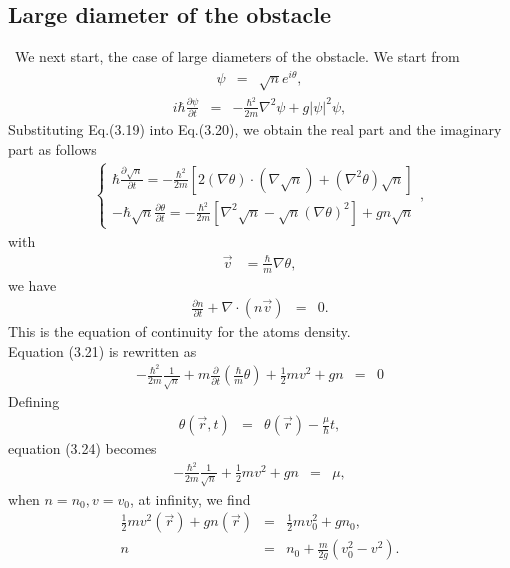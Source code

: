 \documentclass[12pt,a4paper]{report}
\begin{document}
\subsection{Large diameter of the obstacle}
\ We next start, the case of large diameters of the obstacle.
We start from
\begin{eqnarray}
\psi & = & \sqrt{n} e^{i \theta},
\end{eqnarray}
\begin{eqnarray}
i \hbar \frac{\partial \psi}{\partial t} & = &
- \frac{\hbar^2}{2m} \nabla^2 \psi + g | \psi |^2 \psi,
\end{eqnarray}
Substituting Eq.(3.19) into Eq.(3.20), we obtain the real part and the imaginary part as follows
\begin{eqnarray}
\left \{
\begin{array}{l}
\hbar \frac{\partial \sqrt{n}}{\partial t}
= - \frac{\hbar^2}{2m} \left[
2 ( \nabla \theta ) \cdot (\nabla \sqrt{n}) + (\nabla^2 \theta)\sqrt{n}
\right]
\\
-\hbar \sqrt{n} \frac{\partial \theta}{\partial t}
= - \frac{\hbar^2}{2m} \left[
\nabla^2 \sqrt{n} - \sqrt{n} (\nabla \theta)^2
\right]
+ gn \sqrt{n}
\end{array}
\right . ,
\end{eqnarray}
with
\begin{eqnarray}
\vec{v} & = \frac{\hbar}{m} \nabla \theta,
\end{eqnarray}
we have
\begin{eqnarray}
\frac{\partial n}{\partial t} + \nabla \cdot (n \vec{v}) & = & 0.
\end{eqnarray}
This is the equation of continuity for the atoms density.
\\
Equation (3.21) is rewritten as
\begin{eqnarray}
-\frac{\hbar^2}{2m} \frac{1}{\sqrt{n}} + m \frac{\partial}{\partial t} \left( \frac{\hbar}{m} \theta \right)
+ \frac{1}{2} m v^2 + gn & = & 0
\end{eqnarray}
Defining
\begin{eqnarray}
\theta ( \vec{r}, t) & = & \theta( \vec{r} ) - \frac{\mu}{\hbar} t,
\end{eqnarray}
equation (3.24) becomes
\begin{eqnarray}
-\frac{\hbar^2}{2m} \frac{1}{\sqrt{n}} + \frac{1}{2} m v^2 + gn & = & \mu,
\end{eqnarray}
when $n = n_0, v=v_0$, at infinity, we find
\begin{eqnarray}
\frac{1}{2} m v^2(\vec{r}) + gn(\vec{r}) & = & \frac{1}{2} m v_0^2 + gn_0,
\\
n & = & n_0 + \frac{m}{2g} (v_0^2 - v^2 ).
\end{eqnarray}
\end{document}
